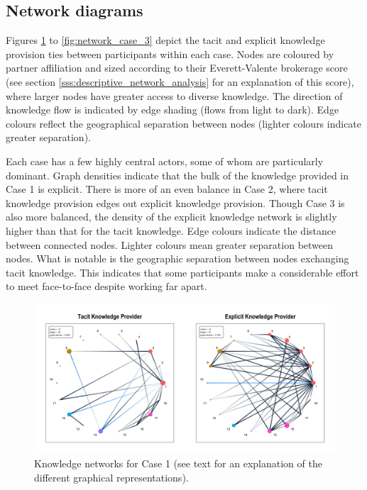 \subsection{Network diagrams}

Figures \ref{fig:network_case_1} to \ref{fig:network_case_3} depict the tacit and explicit knowledge provision ties between participants within each case. Nodes are coloured by partner affiliation and sized according to their Everett-Valente brokerage score (see section \ref{sss:descriptive_network_analysis} for an explanation of this score), where larger nodes have greater access to diverse knowledge. The direction of knowledge flow is indicated by edge shading (flows from light to dark). Edge colours reflect the geographical separation between nodes (lighter colours indicate greater separation). \medskip

Each case has a few highly central actors, some of whom are particularly dominant. Graph densities indicate that the bulk of the knowledge provided in Case 1 is explicit. There is more of an even balance in Case 2, where tacit knowledge provision edges out explicit knowledge provision. Though Case 3 is also more balanced, the density of the explicit knowledge network is slightly higher than that for the tacit knowledge. Edge colours indicate the distance between connected nodes. Lighter colours mean greater separation between nodes. What is notable is the geographic separation between nodes exchanging tacit knowledge. This indicates that some participants make a considerable effort to meet face-to-face despite working far apart. \medskip

\begin{figure}
\includegraphics[width=1\linewidth]{Images/networks_case_1.png}
\caption[Knowledge networks for Case 1]{Knowledge networks for Case 1 (see text for an explanation of the different graphical representations).}
\label{fig:network_case_1} 
\end{figure}

